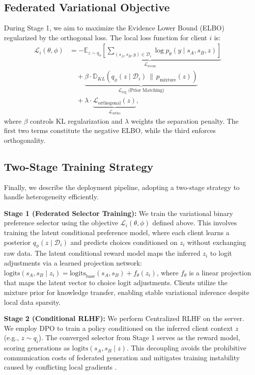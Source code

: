 \subsection{Federated Variational Objective}
During Stage 1, we aim to maximize the Evidence Lower Bound (ELBO) regularized by the orthogonal loss. The local loss function for client $i$ is:
\begin{align}
    \mathcal{L}_i(\theta, \phi) &= \underbrace{-\mathbb{E}_{z \sim q_\phi} \left[ \sum_{(s_A, s_B, y) \in \mathcal{D}_i} \log p_\theta(y \mid s_A, s_B, z) \right]}_{\mathcal{L}_{\text{recon}}} \nonumber \\
    &\quad + \underbrace{\beta \cdot \mathbb{D}_{KL}(q_\phi(z \mid \mathcal{D}_i) \,\|\, p_{\text{mixture}}(z))}_{\mathcal{L}_{\text{reg}} \text{ (Prior Matching)}} \nonumber \\
    &\quad + \lambda \cdot \underbrace{\mathcal{L}_{\text{orthogonal}}(z)}_{\mathcal{L}_{\text{ortho}}},
\end{align}
where $\beta$ controls KL regularization and $\lambda$ weights the separation penalty. The first two terms constitute the negative ELBO, while the third enforces orthogonality.

\subsection{Two-Stage Training Strategy}
Finally, we describe the deployment pipeline, adopting a two-stage strategy \citep{wu2024towards} to handle heterogeneity efficiently.

\textbf{Stage 1 (Federated Selector Training):} We train the variational binary preference selector using the objective $\mathcal{L}_i(\theta, \phi)$ defined above. This involves training the latent conditional preference model, where each client learns a posterior $q_\phi(z \mid \mathcal{D}_i)$ and predicts choices conditioned on $z_i$ without exchanging raw data. The latent conditional reward model maps the inferred $z_i$ to logit adjustments via a learned projection network: $\text{logits}(s_A, s_B \mid z_i) = \text{logits}_{\text{base}}(s_A, s_B) + f_\theta(z_i)$, where $f_\theta$ is a linear projection that maps the latent vector to choice logit adjustments. Clients utilize the mixture prior for knowledge transfer, enabling stable variational inference despite local data sparsity.

\textbf{Stage 2 (Conditional RLHF):} We perform Centralized RLHF \citep{rafailov2023direct} on the server. We employ DPO to train a policy conditioned on the inferred client context $z$ (e.g., $z \sim q_i$). The converged selector from Stage 1 serves as the reward model, scoring generations as $\text{logits}(s_A, s_B \mid z)$. This decoupling avoids the prohibitive communication costs of federated generation and mitigates training instability caused by conflicting local gradients \citep{wu2024towards}.
